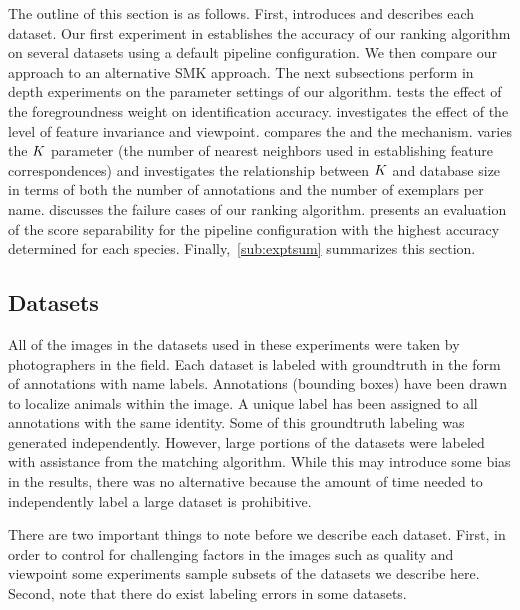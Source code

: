    The outline of this section is as follows.
    First,  introduces and describes each dataset.
    Our first experiment in  establishes the accuracy of our ranking algorithm on several
      datasets using a default pipeline configuration.
    We then compare our approach to an alternative  SMK approach.
    The next subsections perform in depth experiments on the parameter settings of our algorithm.
     tests the effect of the foregroundness weight on identification accuracy.
     investigates the effect of the level of feature invariance and viewpoint.
     compares the \csumprefix{} and the \nsumprefix{} \namescoring{} mechanism.
     varies the $K$ parameter (the number of nearest neighbors used in establishing feature
      correspondences) and investigates the relationship between $K$ and database size in terms of both the number
      of annotations and the number of exemplars per name.
     discusses the failure cases of our ranking algorithm.
     presents an evaluation of the score separability for the pipeline configuration with the
      highest accuracy determined for each species.
    Finally,~\cref{sub:exptsum} summarizes this section.


    \subsection{Datasets}\label{sub:datasets}

        All of the images in the datasets used in these experiments were taken by photographers in the field.
        Each dataset is labeled with groundtruth in the form of annotations with name labels.
        Annotations (bounding boxes) have been drawn to localize animals within the image.
        A unique \name{} label has been assigned to all annotations with the same identity.
        Some of this groundtruth labeling was generated independently.
        However, large portions of the datasets were labeled with assistance from the matching algorithm.
        While this may introduce some bias in the results, there was no alternative because the amount of time
          needed to independently label a large dataset is prohibitive.

        There are two important things to note before we describe each dataset.
        First, in order to control for challenging factors in the images such as quality and viewpoint some
          experiments sample subsets of the datasets we describe here.
        Second, note that there do exist labeling errors in some datasets.

